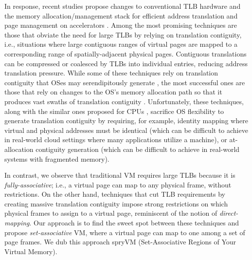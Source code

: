 In response, recent studies propose changes to conventional TLB
hardware and the memory allocation/management stack for efficient
address translation and page management on accelerators
\cite{pichai:architectural, power:supporting,
  ausavarungnirun:mosaic}. Among the most promising techniques are
those that obviate the need for large TLBs by relying on translation
contiguity, i.e., situations where large contiguous ranges of virtual
pages are mapped to a corresponding range of spatially-adjacent
physical pages. Contiguous translations can be compressed or coalesced
by TLBs into individual entries, reducing address translation
pressure. While some of these techniques rely on translation
contiguity that OSes may serendipitously generate \cite{pham:colt,
  bhattacharjee:large-reach, cox:efficient, pham:increasing}, the most
successful ones are those that rely on changes to the OS's memory
allocation path so that it produces vast swaths of translation
contiguity \cite{haria:devirtualizing}. Unfortunately, these
techniques, along with the similar ones proposed for CPUs
\cite{basu:efficient, gandhi:range}, sacrifice OS flexibility to
generate translation contiguity by requiring, for example, identity
mapping where virtual and physical addresses must be identical (which
can be difficult to achieve in real-world cloud settings where many
applications utilize a machine), or at-allocation contiguity
generation (which can be difficult to achieve in real-world systems
with fragmented memory). %

In contrast, we observe that traditional VM requires large
TLBs because it is {\it fully-associative}; i.e., a virtual page can
map to any physical frame, without restrictions. On the other hand, techniques that cut TLB
requirements by creating massive translation contiguity
\cite{basu:efficient, gandhi:range, haria:devirtualizing} impose
strong restrictions on which physical frames to assign to a virtual
page, reminiscent of the notion of {\it direct-mapping}. Our approach
is to find the sweet spot between these techniques and propose {\it
  set-associative} VM, where a virtual page can map to one among a set
of page frames. We dub this approach spryVM (Set-Associative Regions
of Your Virtual Memory). 

